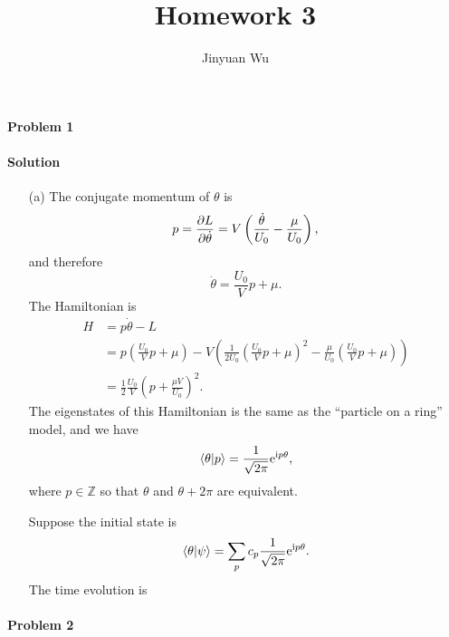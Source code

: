\documentclass[hyperref, a4paper]{article}
\title{Homework 3}
\author{Jinyuan Wu}
\newcommand*{\ii}{\mathrm{i}}
\newcommand*{\ee}{\mathrm{e}}
\begin{document}
\maketitle

\paragraph{Problem 1} 

\paragraph{Solution} \begin{itemize}
\item[(a)] The conjugate momentum of $\theta$ is 
\begin{equation}
    p = \pdv{L}{\dot{\theta}}
    = V \left( \frac{\dot{\theta}}{U_0} - \frac{\mu}{U_0} \right),
\end{equation}
and therefore 
\begin{equation}
    \dot{\theta} = \frac{U_0}{V} p + \mu.
\end{equation}
The Hamiltonian is 
\begin{equation}
    \begin{aligned}
        H &= p \dot{\theta} - L \\
        &= p \left( \frac{U_0}{V} p + \mu \right) - 
        V \left( 
            \frac{1}{2U_0} \left( \frac{U_0}{V} p + \mu \right)^2 
            - \frac{\mu}{U_0} \left( \frac{U_0}{V} p + \mu \right) 
        \right) \\ 
        &= \frac{1}{2} \frac{U_0}{V} \left( p + \frac{\mu V}{U_0} \right)^2.
    \end{aligned}
\end{equation}
The eigenstates of this Hamiltonian is the same as the ``particle on a ring'' model, and we have 
\begin{equation}
    \braket{\theta}{p} = \frac{1}{\sqrt{2\pi}} \ee^{\ii p \theta},
\end{equation}
where $p \in \mathbb{Z}$ so that $\theta$ and $\theta + 2\pi$ are equivalent.

Suppose the initial state is 
\begin{equation}
    \braket{\theta}{\psi} = \sum_p c_p \frac{1}{\sqrt{2\pi}} \ee^{\ii p \theta}.
\end{equation}
The time evolution is 

\end{itemize}

\paragraph{Problem 2} 
\end{document}
